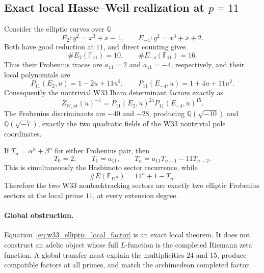 \subsection{Exact local Hasse--Weil realization at $p=11$}

Consider the elliptic curves over $\mathbb Q$
\[
 E_2: y^2=x^3+x-1,
 \qquad
 E_{-4}: y^2=x^3+x+2.
\]
Both have good reduction at $11$, and direct counting gives
\[
 \#E_2(\mathbb F_{11})=10,
 \qquad
 \#E_{-4}(\mathbb F_{11})=16.
\]
Thus their Frobenius traces are $a_{11}=2$ and $a_{11}=-4$, respectively,
and their local polynomials are
\[
 P_{11}(E_2,u)=1-2u+11u^2,
 \qquad
 P_{11}(E_{-4},u)=1+4u+11u^2.
\]
Consequently the nontrivial W33 Ihara determinant factors exactly as
\begin{equation}
 Z_{W,\mathrm{nt}}(u)^{-1}
 =P_{11}(E_2,u)^{24}P_{11}(E_{-4},u)^{15}.
 \label{eq:w33_elliptic_local_factor}
\end{equation}
The Frobenius discriminants are $-40$ and $-28$, producing
$\mathbb Q(\sqrt{-10})$ and $\mathbb Q(\sqrt{-7})$, exactly the two
quadratic fields of the W33 nontrivial pole coordinates.

If $T_n=\alpha^n+\beta^n$ for either Frobenius pair, then
\begin{equation}
 T_0=2,
 \qquad
 T_1=a_{11},
 \qquad
 T_n=a_{11}T_{n-1}-11T_{n-2}.
\end{equation}
This is simultaneously the Hashimoto sector recurrence, while
\[
 \#E(\mathbb F_{11^n})=11^n+1-T_n.
\]
Therefore the two W33 nonbacktracking sectors are exactly two elliptic
Frobenius sectors at the local prime $11$, at every extension degree.

\paragraph{Global obstruction.}
Equation~\eqref{eq:w33_elliptic_local_factor} is an exact local theorem. It
does not construct an adelic object whose full $L$-function is the completed
Riemann zeta function. A global transfer must explain the multiplicities
$24$ and $15$, produce compatible factors at all primes, and match the
archimedean completed factor.

